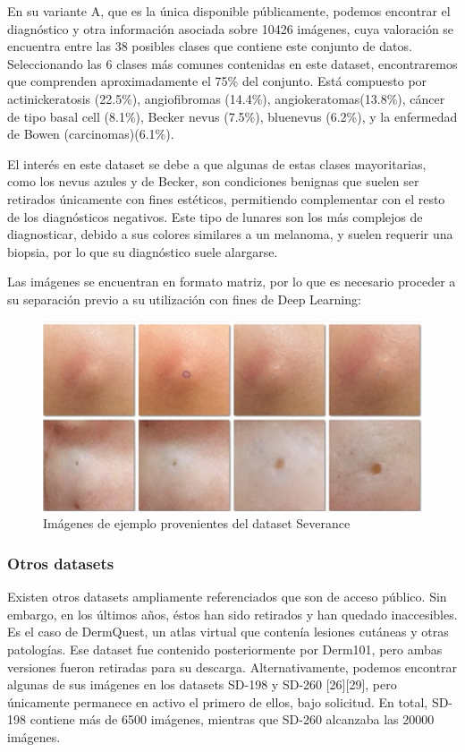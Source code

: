 En su variante A, que es la única disponible públicamente, podemos encontrar el diagnóstico y otra información asociada sobre 10426 imágenes, cuya valoración se encuentra entre las 38 posibles clases que contiene este conjunto de datos. \\

Seleccionando las 6 clases más comunes contenidas en este dataset, encontraremos que comprenden aproximadamente el 75\% del conjunto. Está compuesto por actinickeratosis (22.5\%), angiofibromas (14.4\%), angiokeratomas(13.8\%), cáncer de tipo basal cell (8.1\%), Becker nevus (7.5\%), bluenevus (6.2\%), y la enfermedad de Bowen (carcinomas)(6.1\%).

El interés en este dataset se debe a que algunas de estas clases mayoritarias, como los nevus azules y de Becker, son condiciones benignas que suelen ser retirados únicamente con fines estéticos, permitiendo complementar con el resto de los diagnósticos negativos. Este tipo de lunares son los más complejos de diagnosticar, debido a sus colores similares a un melanoma, y suelen requerir una biopsia, por lo que su diagnóstico suele alargarse.

Las imágenes se encuentran en formato matriz, por lo que es necesario proceder a su separación previo a su utilización con fines de Deep Learning: 

\begin{figure}[H]
	\centering
	\includegraphics[scale = 0.5]{imagenes/Severance.png}
	\caption{Imágenes de ejemplo provenientes del dataset Severance   }
\end{figure}

\subsubsection{Otros datasets}
Existen otros datasets ampliamente referenciados que son de acceso público. Sin embargo, en los últimos años, éstos han sido retirados y han quedado inaccesibles. Es el caso de DermQuest, un atlas virtual que contenía lesiones cutáneas y otras patologías. Ese dataset fue contenido posteriormente por Derm101, pero ambas versiones fueron retiradas para su descarga. Alternativamente, podemos encontrar algunas de sus imágenes en los datasets SD-198 y SD-260 [26][29], pero únicamente permanece en activo el primero de ellos, bajo solicitud. En total, SD-198 contiene más de 6500 imágenes, mientras que SD-260 alcanzaba las 20000 imágenes.

